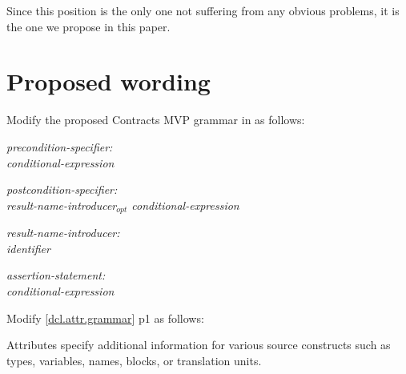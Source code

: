 Since this position is the only one not suffering from any obvious problems, it is the one we propose in this paper.

\section{Proposed wording}

Modify the proposed Contracts MVP grammar in \cite{P2900R5} as follows:

\begin{adjustwidth}{0.5cm}{0.5cm}

\emph{precondition-specifier:} \\
\phantom{~~~}  \tcode{(} \emph{conditional-expression} \tcode{)}

\emph{postcondition-specifier:} \\
\phantom{~~~}  \tcode{(} \emph{result-name-introducer$_{opt}$ conditional-expression} \tcode{)}

\emph{result-name-introducer:} \\
\phantom{~~~}\emph{identifier} \tcode{:}

\emph{assertion-statement:} \\
\phantom{~~~}  \tcode{(} \emph{conditional-expression} \tcode{) ;}

\end{adjustwidth}

Modify [\href{https://eel.is/c++draft/dcl.attr.grammar#1.sentence-1}{dcl.attr.grammar}] p1 as follows:

\begin{adjustwidth}{0.5cm}{0.5cm}
Attributes specify additional information for various source constructs such as types, variables, names, blocks, or translation units.
\end{adjustwidth}





\renewcommand{\bibname}{References}




